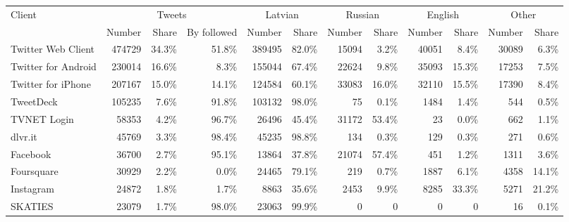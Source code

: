 \begin{tabular}{lrrrrrrrrrrr} 
\toprule
\multirow{2}{*}{Client} & \multicolumn{3}{c}{Tweets} & \multicolumn{2}{c}{Latvian} & \multicolumn{2}{c}{Russian} & \multicolumn{2}{c}{English} & \multicolumn{2}{c}{Other} \\
\cmidrule(r){2-4} \cmidrule(r){5-6} \cmidrule(r){7-8} \cmidrule(r){9-10} \cmidrule(r){11-12}
{} &  Number & Share & By followed & Number & Share & Number & Share & Number & Share & Number & Share \\
\midrule
Twitter Web Client  &      474729 &       34.3\% &                51.8\% &            389495 &             82.0\% &             15094 &              3.2\% &             40051 &              8.4\% &            30089 &             6.3\% \\
Twitter for Android &      230014 &       16.6\% &                 8.3\% &            155044 &             67.4\% &             22624 &              9.8\% &             35093 &             15.3\% &            17253 &             7.5\% \\
Twitter for iPhone  &      207167 &       15.0\% &                14.1\% &            124584 &             60.1\% &             33083 &             16.0\% &             32110 &             15.5\% &            17390 &             8.4\% \\
TweetDeck           &      105235 &        7.6\% &                91.8\% &            103132 &             98.0\% &                75 &              0.1\% &              1484 &              1.4\% &              544 &             0.5\% \\
TVNET Login         &       58353 &        4.2\% &                96.7\% &             26496 &             45.4\% &             31172 &             53.4\% &                23 &              0.0\% &              662 &             1.1\% \\
dlvr.it             &       45769 &        3.3\% &                98.4\% &             45235 &             98.8\% &               134 &              0.3\% &               129 &              0.3\% &              271 &             0.6\% \\
Facebook            &       36700 &        2.7\% &                95.1\% &             13864 &             37.8\% &             21074 &             57.4\% &               451 &              1.2\% &             1311 &             3.6\% \\
Foursquare          &       30929 &        2.2\% &                 0.0\% &             24465 &             79.1\% &               219 &              0.7\% &              1887 &              6.1\% &             4358 &            14.1\% \\
Instagram           &       24872 &        1.8\% &                 1.7\% &              8863 &             35.6\% &              2453 &              9.9\% &              8285 &             33.3\% &             5271 &            21.2\% \\
SKATIES             &       23079 &        1.7\% &                98.0\% &             23063 &             99.9\% &                 0 &                 0 &                 0 &                 0 &               16 &             0.1\% \\
\bottomrule
\end{tabular}
